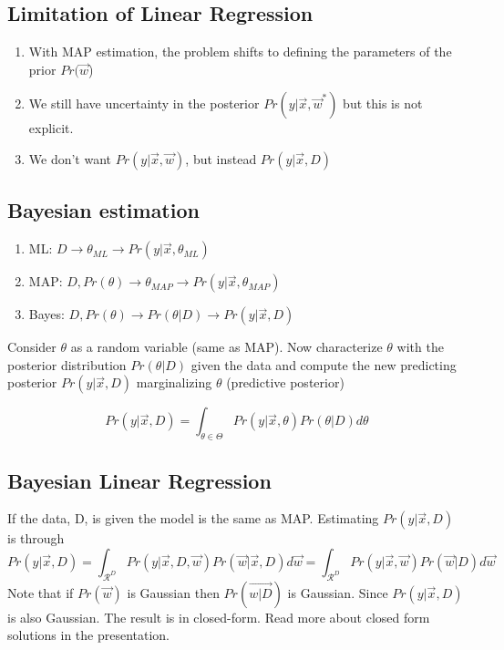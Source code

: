 \documentclass[12pt]{article}
\numberwithin{equation}{section}
\begin{document}
\subsection{Limitation of Linear Regression}
\begin{enumerate}
\item With MAP estimation, the problem shifts to defining the parameters of the prior $Pr(\vec{w}$)
\item We still have uncertainty in the posterior $Pr(y|\vec{x},\vec{w}^*)$ but this is not explicit.
\item We don’t want $Pr(y|\vec{x},\vec{w})$, but instead $P r(y|\vec{x},D)$
\end{enumerate}

\subsection{Bayesian estimation}
\begin{enumerate}
\item ML: $D \to \theta_{ML} \to Pr(y | \vec{x}, \theta_{ML})$
\item MAP: $D, Pr(\theta) \to \theta_{MAP} \to Pr(y | \vec{x}, \theta_{MAP})$
\item Bayes: $D, Pr(\theta)  \to Pr(\theta | D) \to Pr(y | \vec{x},D)$

\end{enumerate}
Consider $\theta$ as a random variable (same as MAP). Now characterize $\theta$ with the posterior distribution $Pr(\theta | D)$ given the data and compute the new predicting posterior $Pr(y|\vec{x}, D)$ marginalizing $\theta$  (predictive posterior)

\begin{equation}
Pr(y|\vec{x}, D) = \int_{\theta \in \Theta} Pr(y|\vec{x}, \theta) Pr(\theta | D) d\theta
\end{equation}

\subsection{Bayesian Linear Regression}
If the data, D, is given the model is the same as MAP. Estimating $Pr(y | \vec{x}, D)$ is through
\begin{equation}
Pr(y | \vec{x}, D) = \int_{\mathcal{R}^D} Pr(y | \vec{x},D, \vec{w})Pr(\vec{w}|\vec{x},D) d\vec{w} = \int_{\mathcal{R}^D} Pr(y | \vec{x}, \vec{w})Pr(\vec{w}| D) d\vec{w}
\end{equation}
Note that if $Pr(\vec{w})$ is Gaussian then $Pr(\vec{w | D})$ is Gaussian. Since $Pr(y|\vec{x},D )$ is also Gaussian. The result is in closed-form. Read more about closed form solutions in the presentation.
\end{document}
